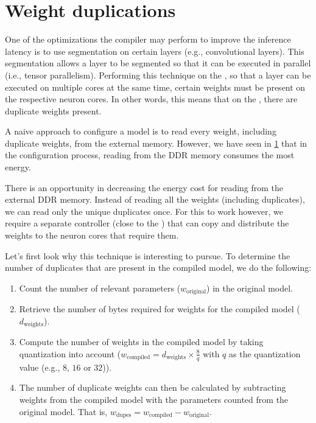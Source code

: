 \section{Weight duplications}
One of the optimizations the compiler may perform to improve the inference latency is to use segmentation on certain layers (e.g., convolutional layers).
This segmentation allows a layer to be segmented so that it can be executed in parallel (i.e., tensor parallelism).
Performing this technique on the \graicore{}, so that a layer can be executed on multiple cores at the same time, certain weights must be present on the respective neuron cores.
In other words, this means that on the \graicore{}, there are duplicate weights present.

A naive approach to configure a model is to read every weight, including duplicate weights, from the external memory.
However, we have seen in \ref{} that in the configuration process, reading from the DDR memory consumes the most energy.

There is an opportunity in decreasing the energy cost for reading from the external DDR memory.
Instead of reading all the weights (including duplicates), we can read only the unique duplicates once.
For this to work however, we require a separate controller (close to the \graicore{}) that can copy and distribute the weights to the neuron cores that require them.

Let's first look why this technique is interesting to pursue.
To determine the number of duplicates that are present in the compiled model, we do the following:
\begin{enumerate}
    \item
    Count the number of relevant parameters ($w_\textrm{original}$) in the original model.
    \item
    Retrieve the number of bytes required for weights for the compiled model ($d_\textrm{weights}$).
    \item
    Compute the number of weights in the compiled model by taking quantization into account ($w_\textrm{compiled} = d_\textrm{weights} \times \frac{8}{q}$ with $q$ as the quantization value (e.g., $8$, $16$ or $32$)).
    \item  
    The number of duplicate weights can then be calculated by subtracting weights from the compiled model with the parameters counted from the original model. That is, $w_\textrm{dupes} = w_\textrm{compiled} - w_\textrm{original}$.
\end{enumerate}

